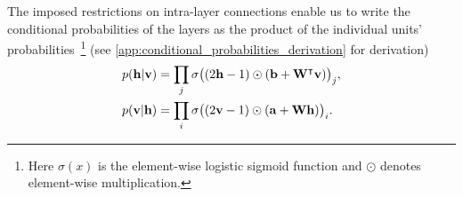 The imposed restrictions on intra-layer connections enable us to write the conditional probabilities of the layers as the product of the individual units' probabilities~\footnote{Here \( \sigma(x) \) is the element-wise logistic sigmoid function and \( \odot \) denotes element-wise multiplication.} (see \cref{app:conditional_probabilities_derivation} for derivation)
\begin{align}
\begin{split}
    p(\mathbf{h} | \mathbf{v})
        &= \prod_j \sigma\big( (2\mathbf{h} - 1) \odot (\mathbf{b} + \mathbf{W}^\intercal\mathbf{v}) \big)_j, \\
    p(\mathbf{v} | \mathbf{h})
        &= \prod_i \sigma\big( (2\mathbf{v} - 1) \odot (\mathbf{a} + \mathbf{W}\mathbf{h}) \big)_i.
\end{split}
\end{align}

